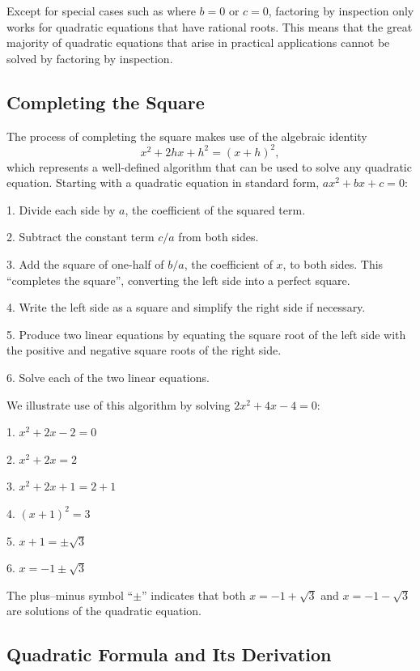 Except for special cases such as where $b = 0$ or $c = 0$, factoring by inspection only works for quadratic equations that have rational roots. This means that the great majority of quadratic equations that arise in practical applications cannot be solved by factoring by inspection.

\subsection{Completing the Square}
\label{sss:comp-a359}

The process of completing the square makes use of the algebraic identity
\[
x^2 + 2hx + h^2 = (x + h)^2,
\]
which represents a well-defined algorithm that can be used to solve any quadratic equation. Starting with a quadratic equation in standard form, $ax^2 + bx + c = 0$:

1. Divide each side by $a$, the coefficient of the squared term.

2. Subtract the constant term $c/a$ from both sides.

3. Add the square of one-half of $b/a$, the coefficient of $x$, to both sides. This ``completes the square'', converting the left side into a perfect square.

4. Write the left side as a square and simplify the right side if necessary.

5. Produce two linear equations by equating the square root of the left side with the
positive and negative square roots of the right side.

6. Solve each of the two linear equations.

We illustrate use of this algorithm by solving $2x^2 + 4x - 4 = 0$:

1. $x^2 + 2x - 2 = 0$

2. $x^2 + 2x = 2$

3. $x^2 + 2x + 1 = 2 + 1$

4. $(x + 1)^2 = 3$

5. $x + 1 = \pm \sqrt{3}$

6. $x = -1 \pm \sqrt{3}$

The plus–minus symbol ``$\pm$'' indicates that both $x = -1 + \sqrt{3}$ and $x = -1 - \sqrt{3}$ are solutions of the quadratic equation.

\subsection{Quadratic Formula and Its Derivation}
\label{sss:quad-d91c}

